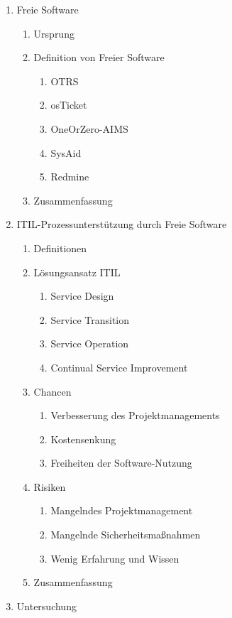 \begin{center}
\begin{description}
\begin{enumerate}
\begin{enumerate}
\begin{enumerate}
		\end{enumerate}
     	\end{enumerate}
     \item Freie Software
     \begin{enumerate}
     	\item Ursprung
	\item Definition von Freier Software
	\begin{enumerate}
		\item OTRS
		\item osTicket
		\item OneOrZero-AIMS
		\item SysAid
		\item Redmine
	\end{enumerate}
	\item Zusammenfassung
     \end{enumerate}
     \item ITIL-Prozessunterstützung durch Freie Software
     \begin{enumerate}
     	\item Definitionen
	\item Lösungsansatz ITIL
	\begin{enumerate}
		\item Service Design
		\item Service Transition
		\item Service Operation
		\item Continual Service Improvement
     	\end{enumerate}
	\item Chancen
	\begin{enumerate}
		\item Verbesserung des Projektmanagements
		\item Kostensenkung
		\item Freiheiten der Software-Nutzung
	\end{enumerate}
	\item Risiken
	\begin{enumerate}
		\item Mangelndes Projektmanagement
		\item Mangelnde Sicherheitsmaßnahmen
		\item Wenig Erfahrung und Wissen
	\end{enumerate}
	\item Zusammenfassung
      \end{enumerate}
      \item Untersuchung
      \begin{enumerate}

\end{enumerate}
\end{enumerate}
\end{description}
\end{center}
